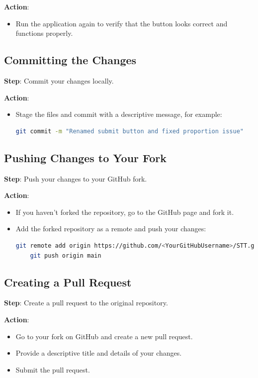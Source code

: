 \documentclass{article}
\begin{document}
\textbf{Action}: 
\begin{itemize}
    \item Run the application again to verify that the button looks correct and functions properly.
\end{itemize}

\subsection{Committing the Changes}
\textbf{Step}: Commit your changes locally.

\textbf{Action}:
\begin{itemize}
    \item Stage the files and commit with a descriptive message, for example:
    \begin{lstlisting}[language=bash]
    git commit -m "Renamed submit button and fixed proportion issue"
    \end{lstlisting}
\end{itemize}

\subsection{Pushing Changes to Your Fork}
\textbf{Step}: Push your changes to your GitHub fork.

\textbf{Action}:
\begin{itemize}
    \item If you haven’t forked the repository, go to the GitHub page and fork it.
    \item Add the forked repository as a remote and push your changes:
    \begin{lstlisting}[language=bash]
    git remote add origin https://github.com/<YourGitHubUsername>/STT.git
    git push origin main
    \end{lstlisting}
\end{itemize}

\subsection{Creating a Pull Request}
\textbf{Step}: Create a pull request to the original repository.

\textbf{Action}:
\begin{itemize}
    \item Go to your fork on GitHub and create a new pull request.
    \item Provide a descriptive title and details of your changes.
    \item Submit the pull request.
\end{itemize}
\end{document}
